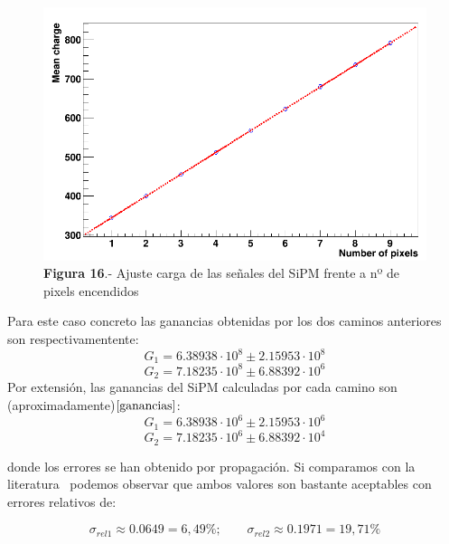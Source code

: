 \begin{enumerate}
\begin{enumerate}
	\begin{figure}[hbtp]
		\centering
		\includegraphics[scale=0.4]{FitPosicionPixels.png}
		\caption{\textbf{Figura 16}.- Ajuste carga de las señales del SiPM frente a nº de pixels encendidos}
		\end{figure}
			
	\end{enumerate}
	
Para este caso concreto las ganancias obtenidas por los dos caminos anteriores son respectivamentente:
\begin{equation}
G_1= 6.38938 \cdot 10^8 \pm 2.15953 \cdot 10^8
\label{gananciatotalmetodo1} 
\end{equation}
\begin{equation}
G_2=7.18235 \cdot 10^8 \pm 6.88392 \cdot 10^6
\label{gananciatotalmetodo2}
\end{equation}
Por extensión, las ganancias del SiPM calculadas por cada camino son (aproximadamente)$\eqref{ganancias}$: 
\begin{equation}
G_1= 6.38938 \cdot 10^6 \pm 2.15953 \cdot 10^6
\label{gananciaSiPMmetodo1}
\end{equation}
\begin{equation}
G_2= 7.18235 \cdot 10^6 \pm 6.88392 \cdot 10^4
\label{gananciaSiPMmetodo2}
\end{equation}

donde los errores se han obtenido por propagación. Si comparamos con la literatura~\cite{datasheet SiPM} podemos observar que ambos valores son bastante aceptables con errores relativos de:

\begin{equation}
\sigma_{rel1} \approx 0.0649 = 6,49\%; \qquad \sigma_{rel2} \approx 0.1971 =19,71\%
\label{erroresgananciasSiPM}
\end{equation}



\end{enumerate}
